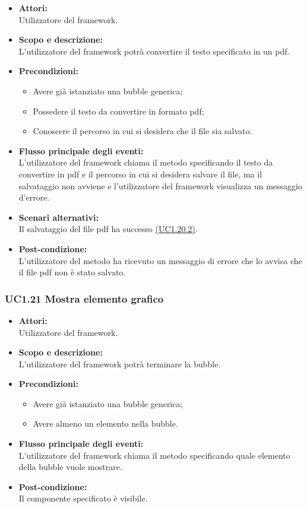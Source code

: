 \begin{itemize}
	\item \textbf{Attori:}
	\\Utilizzatore del framework.
	\item \textbf{Scopo e descrizione:} 
	\\L’utilizzatore del framework potrà convertire il testo specificato in un pdf.
	\item \textbf{Precondizioni:}
	\begin{itemize}
		\item Avere già istanziato una bubble generica;
		\item Possedere il testo da convertire in formato pdf;
		\item Conoscere il percorso in cui si desidera che il file sia salvato.
	\end{itemize}
	\item \textbf{Flusso principale degli eventi:}
	\\L’utilizzatore del framework chiama il metodo specificando il testo da convertire in pdf e il percorso in cui si desidera salvare il file, ma il salvataggio non avviene e l’utilizzatore del framework visualizza un messaggio d’errore.
	\item \textbf{Scenari alternativi:}
	\\Il salvataggio del file pdf ha successo \hyperref[UC1.20.2]{(UC1.20.2)}.
	\item \textbf{Post-condizione:}
	\\L’utilizzatore del metodo ha ricevuto un messaggio di errore che lo avvisa che il file pdf non è stato salvato.
\end{itemize}

\subsubsection{UC1.21 Mostra elemento grafico} \label{UC1.21}

\begin{itemize}
	\item \textbf{Attori:}
	\\Utilizzatore del framework.
	\item \textbf{Scopo e descrizione:} 
	\\L’utilizzatore del framework potrà terminare la bubble.
	\item \textbf{Precondizioni:}
	\begin{itemize}
		\item Avere già istanziato una bubble generica;
		\item Avere almeno un elemento nella bubble.
	\end{itemize}
	\item \textbf{Flusso principale degli eventi:}
	\\L’utilizzatore del framework chiama il metodo specificando quale elemento della bubble vuole mostrare.
	\item \textbf{Post-condizione:}
	\\Il componente specificato è visibile.
\end{itemize}

